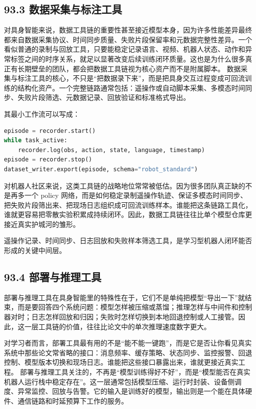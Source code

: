 \subsection*{93.3 数据采集与标注工具}


对具身智能来说，数据工具链的重要性甚至接近模型本身，因为许多性能差异最终都来自数据采集协议、时间同步质量、失败片段保留率和元数据完整性差异。一个看似普通的录制与回放工具，只要能稳定记录语言、视频、机器人状态、动作和异常标签之间的时序关系，就足以显著改变后续训练闭环质量。这也是为什么很多真正有长期壁垒的团队，都会把数据工具链视为核心资产而不是附属脚本。 数据采集与标注工具的核心，不只是“把数据录下来”，而是把具身交互过程变成可回流训练的结构化资产。一个完整链路通常包括：遥操作或自动脚本采集、多模态时间同步、失败片段筛选、元数据记录、回放验证和标准格式导出。

其最小工作流可以写成：

\begin{lstlisting}[language=python]
episode = recorder.start()
while task_active:
    recorder.log(obs, action, state, language, timestamp)
episode = recorder.stop()
dataset_writer.export(episode, schema="robot_standard")
\end{lstlisting}

对机器人社区来说，这类工具链的战略地位常常被低估。因为很多团队真正缺的不是再多一个 policy 网络，而是如何稳定录制遥操作轨迹、保证多模态时间同步、把失败片段筛出来、把现场日志组织成可回流训练样本。谁能把这条链路工具化，谁就更容易把零散实验积累成持续闭环。因此，数据工具链往往比单个模型仓库更接近真实护城河的雏形。

遥操作记录、时间同步、日志回放和失败样本筛选工具，是学习型机器人闭环能否形成的关键中间层。

\subsection*{93.4 部署与推理工具}


部署与推理工具在具身智能里的特殊性在于，它们不是单纯把模型“导出一下”就结束，而是要回答四个系统问题：模型怎样被压缩或蒸馏；推理怎样与中间件和控制器对时；日志怎样回放和归因；失败时怎样切换到本地回退控制或人工接管。因此，这一层工具链的价值，往往比论文中的单次推理速度数字更大。

对学习者而言，部署工具最有用的不是“能不能一键跑”，而是它是否让你看见真实系统中那些论文常省略的接口：消息频率、缓存策略、状态同步、监控报警、回退控制、模型版本切换和现场日志。谁能把这些接口暴露出来，谁就更接近真实工程。 部署与推理工具关注的，不再是“模型训练得好不好”，而是“模型能否在真实机器人运行栈中稳定存在”。这一层通常包括模型压缩、运行时封装、设备侧调度、异常监控、回放与告警。它的输入是训练好的模型，输出则是一个能在具体硬件、通信链路和时延预算下工作的服务。

